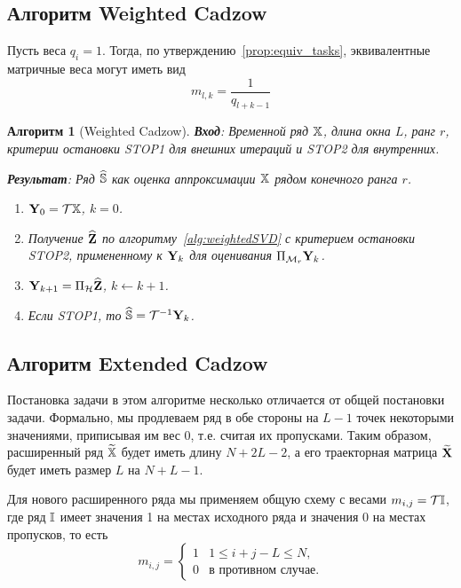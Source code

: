 \documentclass[12pt,a4paper,fleqn,leqno]{article}
\newtheorem{algorithm}{Алгоритм}%
\begin{document}
\subsection{Алгоритм Weighted Cadzow}

Пусть веса $q_{i}=1$. Тогда, по утверждению~\ref{prop:equiv_tasks}, эквивалентные матричные веса могут иметь вид
\begin{equation}
\label{Mw}
   m_{l, k} = \frac{1}{q_{l + k - 1}}
\end{equation}

\begin{algorithm}[Weighted Cadzow]
\textbf{Вход}: Временной ряд $\mathbb{X}$, длина окна $L$, ранг $r$,
критерии остановки STOP1 для внешних итераций и STOP2 для внутренних.

\textbf{Результат}:
Ряд $\widehat{\mathbb{S}}$ как оценка аппроксимации $\mathbb{X}$ рядом конечного ранга $r$.

\begin{enumerate}
\item
$\mathbf{Y}_0 = \mathcal{T} \mathbb{X}$, $k=0$.
\item
Получение $\widehat{\mathbf{Z}}$ по алгоритму~\ref{alg:weightedSVD} с критерием остановки STOP2, примененному к $\mathbf{Y}_k$ для оценивания $\Pi_{\mathcal{M}_r} \mathbf{Y}_{k}$.
\item
$\mathbf{Y}_{k+1} = \Pi_{\mathcal{H}}  \widehat{\mathbf{Z}}$, $k\leftarrow k+1$.
\item
Если STOP1, то $\widehat{\mathbb{S}} = \mathcal{T}^{-1} \mathbf{Y}_k$.
\end{enumerate}
\end{algorithm}

\subsection{Алгоритм Extended Cadzow}

Постановка задачи в этом алгоритме несколько отличается от общей постановки задачи.
Формально, мы продлеваем ряд в обе стороны на $L-1$ точек некоторыми значениями, приписывая им вес 0, т.е.
считая их пропусками. Таким образом, расширенный ряд $\widetilde{\mathbb{X}}$ будет иметь длину $N+2L-2$, а его траекторная матрица
$\widetilde{\mathbf{X}}$ будет иметь размер $L$ на $N+L-1$.

Для нового расширенного ряда мы применяем общую схему с весами $m_{i,j}=\mathcal{T} \mathbb{I}$, где ряд $\mathbb{I}$ имеет
значения 1 на местах исходного ряда и значения 0 на местах пропусков, то есть
\begin{equation*}
m_{i,j} = \begin{cases}
1 & 1 \le i+j-L \le N, \\
0 & \text{в противном случае.}
\end{cases}
\end{equation*}
\end{document}
